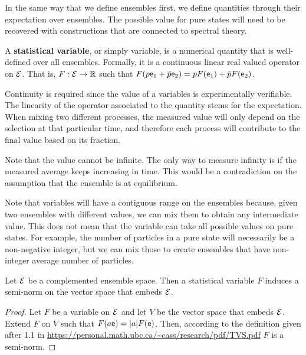 In the same way that we define ensembles first, we define quantities through their expectation over ensembles. The possible value for pure states will need to be recovered with constructions that are connected to spectral theory.

\begin{defn}
	A \textbf{statistical variable}, or simply variable, is a numerical quantity that is well-defined over all ensembles. Formally, it is a continuous linear real valued operator on $\mathcal{E}$. That is, $F : \mathcal{E} \to \mathbb{R}$ such that $F(p \mathsf{e}_1 + \bar{p} \mathsf{e}_2) = p F(\mathsf{e}_1) + \bar{p} F(\mathsf{e}_2)$. 
\end{defn}

\begin{justification}
	Continuity is required since the value of a variables is experimentally verifiable. The linearity of the operator associated to the quantity stems for the expectation. When mixing two different processes, the measured value will only depend on the selection at that particular time, and therefore each process will contribute to the final value based on its fraction.
	
	Note that the value cannot be infinite. The only way to measure infinity is if the measured average keeps increasing in time. This would be a contradiction on the assumption that the ensemble is at equilibrium.
\end{justification}

\begin{remark}
	Note that variables will have a contiguous range on the ensembles because, given two ensembles with different values, we can mix them to obtain any intermediate value. This does not mean that the variable can take all possible values on pure states. For example, the number of particles in a pure state will necessarily be a non-negative integer, but we can mix those to create ensembles that have non-integer average number of particles.
\end{remark}

\begin{prop}
	Let $\mathcal{E}$ be a complemented ensemble space. Then a statistical variable $F$ induces a semi-norm on the vector space that embeds $\mathcal{E}$.
\end{prop}

\begin{proof}
	Let $F$ be a variable on $\mathcal{E}$ and let $V$ be the vector space that embeds $\mathcal{E}$. Extend $F$ on $V$ such that $F(a\mathsf{e}) = |a| F(\mathsf{e})$. Then, according to the definition given after 1.1 in \url{https://personal.math.ubc.ca/~cass/research/pdf/TVS.pdf} $F$ is a semi-norm.
\end{proof}

